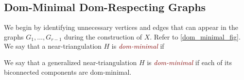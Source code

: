 \documentclass{article}
\newcommand{\defin}[1]{\emph{\textcolor{Maroon}{#1}}}
\theoremstyle{definition}
\begin{document}
\subsection{Dom-Minimal Dom-Respecting Graphs}

We begin by identifying unnecessary vertices and edges that can appear in the graphs $G_1,\ldots,G_{r-1}$ during the construction of $X$. Refer to \cref{dom_minimal_fig}.   We say that a near-triangulation $H$ is \defin{dom-minimal} if
We say that a generalized near-triangulation $H$ is \defin{dom-minimal} if each of its biconnected components are dom-minimal.
\end{document}
